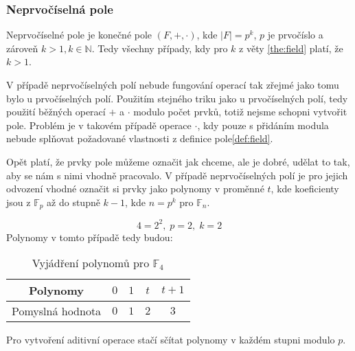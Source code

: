 \subsubsection*{Neprvočíselná pole}
\begin{definition}
    Neprvočíselné pole je konečné pole $(F, +, \cdot)$, kde $|F| = p^k$, $p$ je prvočíslo a
    zároveň $k > 1, k \in \mathbb{N}$. Tedy všechny případy, kdy pro $k$ z věty \ref{the:field}
    platí, že $k>1$.
\end{definition}

V případě neprvočíselných polí nebude fungování operací tak zřejmé jako tomu bylo u
prvočíselných polí. Použitím stejného triku
jako u prvočíselných polí, tedy použití běžných operací $+$ a $\cdot$ modulo počet prvků,
totiž nejsme schopni vytvořit pole. Problém je v takovém případě operace $\cdot$, kdy
pouze s přidáním modula nebude splňovat požadované vlastnosti z definice pole\ref{def:field}.

Opět platí, že prvky pole můžeme označit jak chceme, ale je dobré, udělat to tak, aby se nám
s nimi vhodně pracovalo. V případě neprvočíselných polí je pro jejich odvození vhodné
označit si prvky jako polynomy v proměnné $t$, kde koeficienty jsou z $\mathbb{F}_p$ až do
stupně $k - 1$, kde $n = p^k$ pro $\mathbb{F}_n$.

\begin{example}
    $$4 = 2^2,\; p = 2,\; k = 2$$
    Polynomy v tomto případě tedy budou:
    \begin{table}[h]
        \centering
        \begin{tabular}{|c|c|c|c|c|}
        \hline
        Polynomy          & $0$ & $1$ & $t$ & $t + 1$ \\ \hline
        Pomyslná hodnota & $0$ & $1$ & $2$ & $3$      \\ \hline
        \end{tabular}
        \caption{Vyjádření polynomů pro $\mathbb{F}_{4}$}
        \label{tab:F4_pol}
        \end{table}
\end{example}

Pro vytvoření aditivní operace stačí sčítat polynomy v každém stupni modulo $p$.

